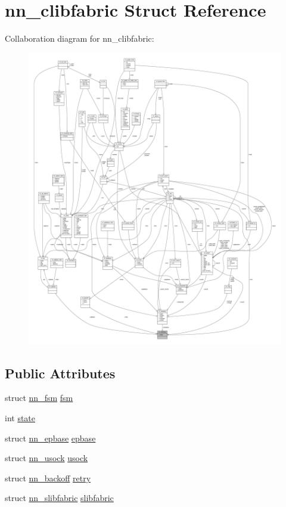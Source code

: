 \hypertarget{structnn__clibfabric}{}\section{nn\+\_\+clibfabric Struct Reference}
\label{structnn__clibfabric}


Collaboration diagram for nn\+\_\+clibfabric\+:\nopagebreak
\begin{figure}[H]
\begin{center}
\leavevmode
\includegraphics[width=350pt]{structnn__clibfabric__coll__graph}
\end{center}
\end{figure}
\subsection*{Public Attributes}
\begin{DoxyCompactItemize}
\item 
struct \hyperlink{structnn__fsm}{nn\+\_\+fsm} \hyperlink{structnn__clibfabric_a79bf5d5042cc883c3492a3f9221b8074}{fsm}
\item 
int \hyperlink{structnn__clibfabric_add852039e47247c9eac1575f90844988}{state}
\item 
struct \hyperlink{structnn__epbase}{nn\+\_\+epbase} \hyperlink{structnn__clibfabric_acdc1beac545401968ce1735fc153676f}{epbase}
\item 
struct \hyperlink{structnn__usock}{nn\+\_\+usock} \hyperlink{structnn__clibfabric_a8ca82c30329e862f0aa321878951d601}{usock}
\item 
struct \hyperlink{structnn__backoff}{nn\+\_\+backoff} \hyperlink{structnn__clibfabric_af75d0e9ca24bce5dba607471dd930976}{retry}
\item 
struct \hyperlink{structnn__slibfabric}{nn\+\_\+slibfabric} \hyperlink{structnn__clibfabric_ac0a7255ca2f0d8a7af3a62723d415297}{slibfabric}
\end{DoxyCompactItemize}


